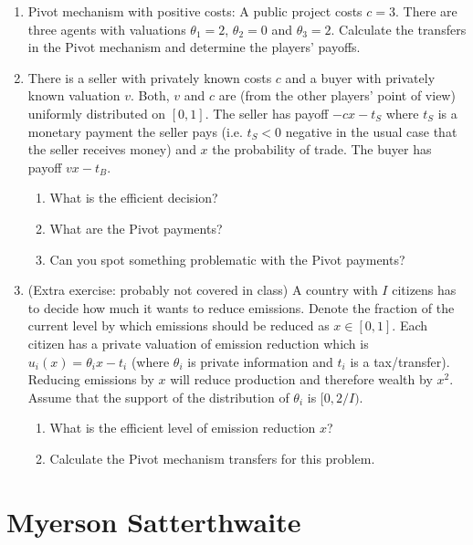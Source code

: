 \documentclass[a4paper,12pt]{article}
\begin{document}
\begin{enumerate}
\item Pivot mechanism with positive costs: A public project costs $c=3$. There are three agents with valuations $\theta _1=2$, $\theta _2=0$ and $\theta _3=2$. Calculate the transfers in the Pivot mechanism and determine the players' payoffs. 
\item There is a seller with privately known costs $c$ and a buyer with privately known valuation $v$. Both, $v$ and $c$ are (from the other players' point of view) uniformly distributed on $[0,1]$. The seller has payoff $-c x-t_S$ where $t_S$ is a monetary payment the seller  pays (i.e. $t_S<0$ negative in the usual case that the seller receives money) and $x$ the probability of trade. The buyer has payoff $vx-t_B$.
  \begin{enumerate}
  \item What is the efficient decision?
  \item What are the Pivot payments?
    \item Can you spot something problematic with the Pivot payments?
    \end{enumerate}
\item (Extra exercise: probably not covered in class) A country with $I$ citizens has to decide how much it wants to reduce emissions. Denote the fraction of the current level by which emissions should be reduced as $x\in[0,1]$. Each citizen has a private valuation of emission reduction which is $u_i(x)=\theta _ix-t_i$ (where $\theta _i$ is private information and $t_i$ is a tax/transfer). Reducing emissions by $x$ will reduce production and therefore wealth by $x^2$. Assume that the support of the distribution of $\theta _i$ is $[0,2/I)$.
  \begin{enumerate}
  \item What is the efficient level of emission reduction $x$?
    \item Calculate the Pivot mechanism transfers for this problem.
  \end{enumerate}
\end{enumerate}

\section{Myerson Satterthwaite}
\label{sec:myers-satt}
\end{document}
